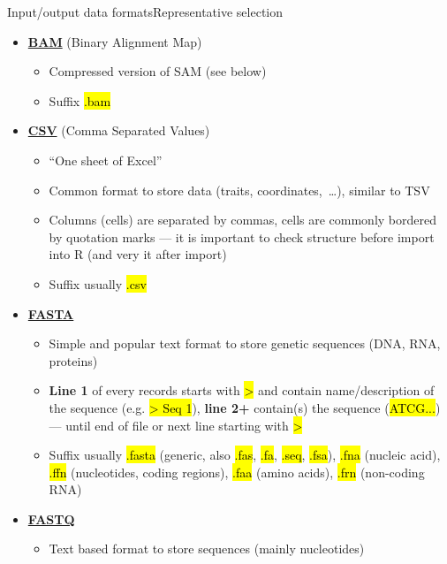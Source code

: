 \documentclass[compress, ucs, xelatex, 11pt, xcolor=svgnames,
  hyperref={
    bookmarks=true,
    unicode=true,
    colorlinks=true,
    pdftitle={Molecular data in R},
    plainpages=false,
    pdfauthor={Vojtech Zeisek},
    pdfsubject={Course about phylogeny and evolution in R},
    pdfcreator={XeLaTeX},
    pdfkeywords={R, evolution, phylogeny, molecular data},
    linkcolor=Tomato,
    anchorcolor=SaddleBrown,
    citecolor=Goldenrod,
    filecolor=DarkMagenta,
    menucolor=Sienna,
    urlcolor=DarkTurquoise,
    pdftex},
  url={hyphens, lowtilde} %
  ]{beamer}
\renewcommand{\texttt}[1]{\hl{\ttfamily #1}}
\begin{document}
\begin{frame}[allowframebreaks]{Input/output data formats}{Representative selection}
  \begin{itemize}
    \item \href{https://en.wikipedia.org/wiki/Binary_Alignment_Map}{\textbf{BAM}} (Binary Alignment Map)
    \begin{itemize}
      \item Compressed version of SAM (see below)
      \item Suffix \texttt{*.bam}
    \end{itemize}
    \item \href{https://en.wikipedia.org/wiki/Comma-separated_values}{\textbf{CSV}} (Comma Separated Values)
    \begin{itemize}
      \item ``One sheet of Excel''
      \item Common format to store data (traits, coordinates,~\ldots), similar to TSV
      \item Columns (cells) are separated by commas, cells are commonly bordered by quotation marks --- it is important to check structure before import into R (and very it after import)
      \item Suffix usually \texttt{*.csv}
    \end{itemize}
    \item \href{https://en.wikipedia.org/wiki/FASTA_format}{\textbf{FASTA}}
    \begin{itemize}
      \item Simple and popular text format to store genetic sequences (DNA, RNA, proteins)
      \item \textbf{Line 1} of every records starts with \texttt{>} and contain name/description of the sequence (e.g. \texttt{> Seq 1}), \textbf{line 2+} contain(s) the sequence (\texttt{ATCG...}) --- until end of file or next line starting with \texttt{>}
      \item Suffix usually \texttt{*.fasta} (generic, also \texttt{*.fas}, \texttt{*.fa}, \texttt{*.seq}, \texttt{*.fsa}), \texttt{*.fna} (nucleic acid), \texttt{*.ffn} (nucleotides, coding regions), \texttt{*.faa} (amino acids), \texttt{*.frn} (non-coding RNA)
    \end{itemize}
    \item \href{https://en.wikipedia.org/wiki/FASTQ_format}{\textbf{FASTQ}}
    \begin{itemize}
      \item Text based format to store sequences (mainly nucleotides)

\end{itemize}
\end{itemize}
\end{frame}
\end{document}
